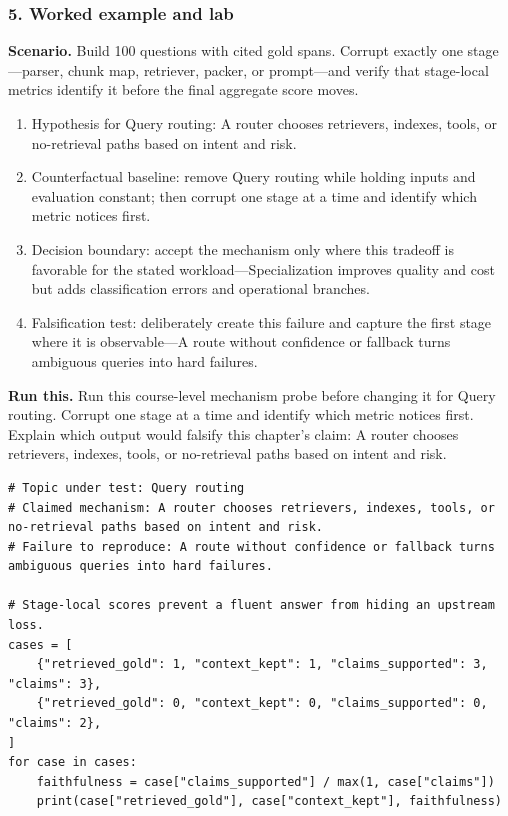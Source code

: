 \subsubsection*{5. Worked example and lab}
\textbf{Scenario.} Build 100 questions with cited gold spans. Corrupt exactly one stage—parser, chunk map, retriever, packer, or prompt—and verify that stage-local metrics identify it before the final aggregate score moves.
\begin{enumerate}
\item Hypothesis for Query routing: A router chooses retrievers, indexes, tools, or no-retrieval paths based on intent and risk.
\item Counterfactual baseline: remove Query routing while holding inputs and evaluation constant; then corrupt one stage at a time and identify which metric notices first.
\item Decision boundary: accept the mechanism only where this tradeoff is favorable for the stated workload—Specialization improves quality and cost but adds classification errors and operational branches.
\item Falsification test: deliberately create this failure and capture the first stage where it is observable—A route without confidence or fallback turns ambiguous queries into hard failures.
\end{enumerate}
\textbf{Run this.} Run this course-level mechanism probe before changing it for Query routing. Corrupt one stage at a time and identify which metric notices first. Explain which output would falsify this chapter's claim: A router chooses retrievers, indexes, tools, or no-retrieval paths based on intent and risk.
\begin{Verbatim}[fontsize=\scriptsize]
# Topic under test: Query routing
# Claimed mechanism: A router chooses retrievers, indexes, tools, or no-retrieval paths based on intent and risk.
# Failure to reproduce: A route without confidence or fallback turns ambiguous queries into hard failures.

# Stage-local scores prevent a fluent answer from hiding an upstream loss.
cases = [
    {"retrieved_gold": 1, "context_kept": 1, "claims_supported": 3, "claims": 3},
    {"retrieved_gold": 0, "context_kept": 0, "claims_supported": 0, "claims": 2},
]
for case in cases:
    faithfulness = case["claims_supported"] / max(1, case["claims"])
    print(case["retrieved_gold"], case["context_kept"], faithfulness)
\end{Verbatim}
